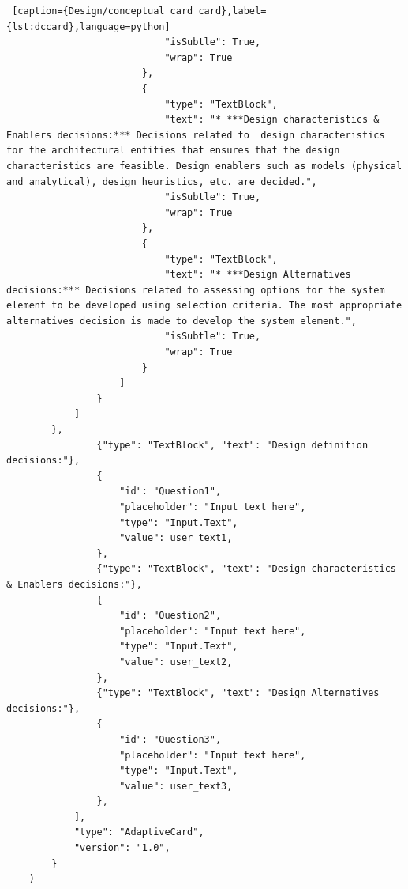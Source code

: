 \begin{lstlisting} [caption={Design/conceptual card card},label={lst:dccard},language=python]
                            "isSubtle": True,
                            "wrap": True
                        },
                        {
                            "type": "TextBlock",
                            "text": "* ***Design characteristics & Enablers decisions:*** Decisions related to  design characteristics for the architectural entities that ensures that the design characteristics are feasible. Design enablers such as models (physical and analytical), design heuristics, etc. are decided.",
                            "isSubtle": True,
                            "wrap": True
                        },
                        {
                            "type": "TextBlock",
                            "text": "* ***Design Alternatives decisions:*** Decisions related to assessing options for the system element to be developed using selection criteria. The most appropriate alternatives decision is made to develop the system element.",
                            "isSubtle": True,
                            "wrap": True
                        }
                    ]
                }
            ]
        },
                {"type": "TextBlock", "text": "Design definition decisions:"},
                {
                    "id": "Question1",
                    "placeholder": "Input text here",
                    "type": "Input.Text",
                    "value": user_text1,
                },
                {"type": "TextBlock", "text": "Design characteristics & Enablers decisions:"},
                {
                    "id": "Question2",
                    "placeholder": "Input text here",
                    "type": "Input.Text",
                    "value": user_text2,
                },
                {"type": "TextBlock", "text": "Design Alternatives decisions:"},
                {
                    "id": "Question3",
                    "placeholder": "Input text here",
                    "type": "Input.Text",
                    "value": user_text3,
                },  
            ],
            "type": "AdaptiveCard",
            "version": "1.0",
        }
    )
\end{lstlisting}

